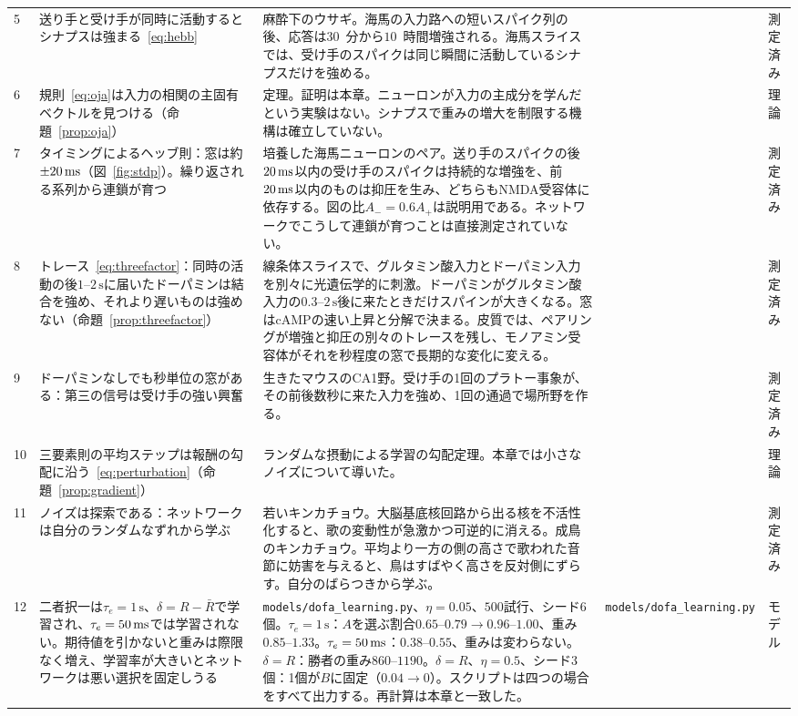 {\begin{longtable}{>{\raggedright}p{0.5cm}>{\raggedright}p{4.0cm}>{\raggedright}p{5.6cm}>{\raggedright}p{2.3cm}>{\raggedright\arraybackslash}p{1.7cm}}
5 & 送り手と受け手が同時に活動するとシナプスは強まる~\eqref{eq:hebb} & 麻酔下のウサギ。海馬の入力路への短いスパイク列の後、応答は$30$~分から$10$~時間増強される。海馬スライスでは、受け手のスパイクは同じ瞬間に活動しているシナプスだけを強める。 & \cite{Bliss1973LTP, Kelso1986hebb} & 測定済み \\
6 & 規則~\eqref{eq:oja}は入力の相関の主固有ベクトルを見つける（命題~\ref{prop:oja}） & 定理。証明は本章。ニューロンが入力の主成分を学んだという実験はない。シナプスで重みの増大を制限する機構は確立していない。 & \cite{Oja1982} & 理論 \\
7 & タイミングによるヘッブ則：窓は約$\pm20\,\text{ms}$（図~\ref{fig:stdp}）。繰り返される系列から連鎖が育つ & 培養した海馬ニューロンのペア。送り手のスパイクの後$20\,\text{ms}$以内の受け手のスパイクは持続的な増強を、前$20\,\text{ms}$以内のものは抑圧を生み、どちらもNMDA受容体に依存する。図の比$A_-=0.6A_+$は説明用である。ネットワークでこうして連鎖が育つことは直接測定されていない。 & \cite{BiPoo1998} & 測定済み \\
8 & トレース~\eqref{eq:threefactor}：同時の活動の後$1$--$2\,\text{s}$に届いたドーパミンは結合を強め、それより遅いものは強めない（命題~\ref{prop:threefactor}） & 線条体スライスで、グルタミン酸入力とドーパミン入力を別々に光遺伝学的に刺激。ドーパミンがグルタミン酸入力の$0.3$--$2\,\text{s}$後に来たときだけスパインが大きくなる。窓はcAMPの速い上昇と分解で決まる。皮質では、ペアリングが増強と抑圧の別々のトレースを残し、モノアミン受容体がそれを秒程度の窓で長期的な変化に変える。 & \cite{Yagishita2014, He2015eligibility} & 測定済み \\
9 & ドーパミンなしでも秒単位の窓がある：第三の信号は受け手の強い興奮 & 生きたマウスのCA1野。受け手の1回のプラトー事象が、その前後数秒に来た入力を強め、1回の通過で場所野を作る。 & \cite{Bittner2017} & 測定済み \\
10 & 三要素則の平均ステップは報酬の勾配に沿う~\eqref{eq:perturbation}（命題~\ref{prop:gradient}） & ランダムな摂動による学習の勾配定理。本章では小さなノイズについて導いた。 & \cite{Williams1992} & 理論 \\
11 & ノイズは探索である：ネットワークは自分のランダムなずれから学ぶ & 若いキンカチョウ。大脳基底核回路から出る核を不活性化すると、歌の変動性が急激かつ可逆的に消える。成鳥のキンカチョウ。平均より一方の側の高さで歌われた音節に妨害を与えると、鳥はすばやく高さを反対側にずらす。自分のばらつきから学ぶ。 & \cite{Olveczky2005, TumerBrainard2007} & 測定済み \\
12 & 二者択一は$\tau_e=1\,\text{s}$、$\delta=R-\bar R$で学習され、$\tau_e=50\,\text{ms}$では学習されない。期待値を引かないと重みは際限なく増え、学習率が大きいとネットワークは悪い選択を固定しうる & \texttt{models/dofa\_learning.py}、$\eta=0.05$、$500$試行、シード$6$個。$\tau_e=1\,\text{s}$：$A$を選ぶ割合$0.65$--$0.79\to0.96$--$1.00$、重み$0.85$--$1.33$。$\tau_e=50\,\text{ms}$：$0.38$--$0.55$、重みは変わらない。$\delta=R$：勝者の重み$860$--$1190$。$\delta=R$、$\eta=0.5$、シード$3$個：1個が$B$に固定（$0.04\to0$）。スクリプトは四つの場合をすべて出力する。再計算は本章と一致した。 & \texttt{models/\allowbreak dofa\_\allowbreak learning.py} & モデル \\

\end{longtable}}
